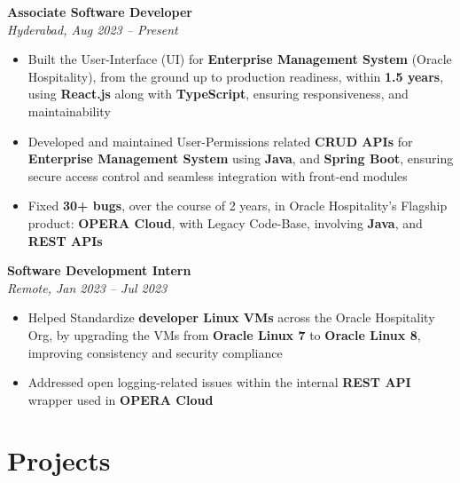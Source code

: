 \documentclass[a4paper,8pt]{article}
\begin{document}
\textbf{Associate Software Developer} \\ \textit{Hyderabad, Aug 2023 -- Present}
\begin{itemize}[leftmargin=1.5em]
  \item Built the User-Interface (UI) for \textbf{Enterprise Management System} (Oracle Hospitality), from the ground up to production readiness, within \textbf{1.5 years}, using \textbf{React.js} along with \textbf{TypeScript}, ensuring responsiveness, and maintainability 
  \item Developed and maintained User-Permissions related \textbf{CRUD APIs} for \textbf{Enterprise Management System} using \textbf{Java}, and \textbf{Spring Boot}, ensuring secure access control and seamless integration with front-end modules
  \item Fixed \textbf{30+ bugs}, over the course of 2 years, in Oracle Hospitality's Flagship product: \textbf{OPERA Cloud}, with Legacy Code-Base, involving \textbf{Java}, and \textbf{REST APIs}
\end{itemize}
\textbf{Software Development Intern} \\ \textit{Remote, Jan 2023 -- Jul 2023}
\begin{itemize}[leftmargin=1.5em]
  \item Helped Standardize \textbf{developer Linux VMs} across the Oracle Hospitality Org, by upgrading the VMs from \textbf{Oracle Linux 7} to \textbf{Oracle Linux 8}, improving consistency and security compliance 
  \item Addressed open logging-related issues within the internal \textbf{REST API} wrapper used in \textbf{OPERA Cloud}
\end{itemize}

\section*{\faRocket\hspace{0.5em}Projects}
\end{document}
